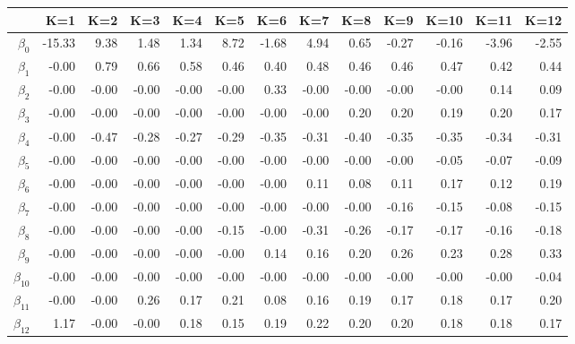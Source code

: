 \begin{table}[ht]
\centering
\begin{tabular}{rrrrrrrrrrrrr}
  \hline
 & K=1 & K=2 & K=3 & K=4 & K=5 & K=6 & K=7 & K=8 & K=9 & K=10 & K=11 & K=12 \\ 
  \hline
$\beta_{0}$ & -15.33 & 9.38 & 1.48 & 1.34 & 8.72 & -1.68 & 4.94 & 0.65 & -0.27 & -0.16 & -3.96 & -2.55 \\ 
  $\beta_{1}$ & -0.00 & 0.79 & 0.66 & 0.58 & 0.46 & 0.40 & 0.48 & 0.46 & 0.46 & 0.47 & 0.42 & 0.44 \\ 
  $\beta_{2}$ & -0.00 & -0.00 & -0.00 & -0.00 & -0.00 & 0.33 & -0.00 & -0.00 & -0.00 & -0.00 & 0.14 & 0.09 \\ 
  $\beta_{3}$ & -0.00 & -0.00 & -0.00 & -0.00 & -0.00 & -0.00 & -0.00 & 0.20 & 0.20 & 0.19 & 0.20 & 0.17 \\ 
  $\beta_{4}$ & -0.00 & -0.47 & -0.28 & -0.27 & -0.29 & -0.35 & -0.31 & -0.40 & -0.35 & -0.35 & -0.34 & -0.31 \\ 
  $\beta_{5}$ & -0.00 & -0.00 & -0.00 & -0.00 & -0.00 & -0.00 & -0.00 & -0.00 & -0.00 & -0.05 & -0.07 & -0.09 \\ 
  $\beta_{6}$ & -0.00 & -0.00 & -0.00 & -0.00 & -0.00 & -0.00 & 0.11 & 0.08 & 0.11 & 0.17 & 0.12 & 0.19 \\ 
  $\beta_{7}$ & -0.00 & -0.00 & -0.00 & -0.00 & -0.00 & -0.00 & -0.00 & -0.00 & -0.16 & -0.15 & -0.08 & -0.15 \\ 
  $\beta_{8}$ & -0.00 & -0.00 & -0.00 & -0.00 & -0.15 & -0.00 & -0.31 & -0.26 & -0.17 & -0.17 & -0.16 & -0.18 \\ 
  $\beta_{9}$ & -0.00 & -0.00 & -0.00 & -0.00 & -0.00 & 0.14 & 0.16 & 0.20 & 0.26 & 0.23 & 0.28 & 0.33 \\ 
  $\beta_{10}$ & -0.00 & -0.00 & -0.00 & -0.00 & -0.00 & -0.00 & -0.00 & -0.00 & -0.00 & -0.00 & -0.00 & -0.04 \\ 
  $\beta_{11}$ & -0.00 & -0.00 & 0.26 & 0.17 & 0.21 & 0.08 & 0.16 & 0.19 & 0.17 & 0.18 & 0.17 & 0.20 \\ 
  $\beta_{12}$ & 1.17 & -0.00 & -0.00 & 0.18 & 0.15 & 0.19 & 0.22 & 0.20 & 0.20 & 0.18 & 0.18 & 0.17 \\ 
   \hline
\end{tabular}
\end{table}
